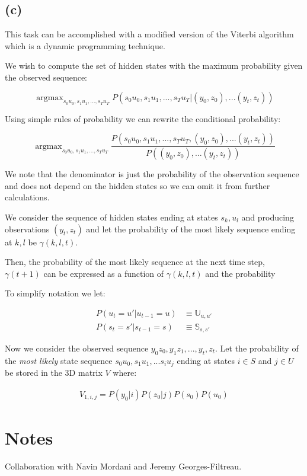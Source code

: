 \documentclass[11pt]{amsart}
\DeclareMathOperator*{\argmax}{argmax}
\begin{document}
\subsection{(c)}

This task can be accomplished with a modified version of the Viterbi algorithm which is a dynamic programming technique.

We wish to compute the set of hidden states with the maximum probability given the observed sequence:

\begin{equation}
\argmax_{s_0 u_0, s_1 u_1, ..., s_T u_T} P(s_0 u_0, s_1 u_1, ..., s_T u_T \vert (y_0, z_0),...(y_t, z_t))
\end{equation}

Using simple rules of probability we can rewrite the conditional probability:

\begin{equation}
\argmax_{s_0 u_0, s_1 u_1, ..., s_T u_T} \frac{P(s_0 u_0, s_1 u_1, ..., s_T u_T, (y_0, z_0),...(y_t, z_t))}{P((y_0, z_0),...(y_t, z_t))}
\end{equation}

We note that the denominator is just the probability of the observation sequence and does not depend on the hidden states so we can omit it from further calculations. 

We consider the sequence of hidden states ending at states $s_k, u_l$ and producing observations $(y_t, z_t)$ and let the probability of the most likely sequence ending at $k, l$ be $\gamma(k, l, t)$.

Then, the probability of the most likely sequence at the next time step, $\gamma(t+1)$ can be expressed as a function of $\gamma(k,l,t)$ and the probability


To simplify notation we let:

\begin{equation}
\begin{aligned}
P(u_t=u' \vert u_{t-1} = u) &\equiv \mathbb{U}_{u, u'}\\
P(s_t=s' \vert s_{t-1} = s) &\equiv \mathbb{S}_{s, s'}
\end{aligned}
\end{equation}

Now we consider the observed sequence $y_0z_0, y_1z_1, ..., y_t, z_t$. Let the probability of the {\it most likely} state sequence $s_0u_0, s_1u_1, ... s_iu_j$ ending at states $i \in S$ and $j \in U$ be stored in the 3D matrix $V$ where:

\begin{equation}
\begin{aligned}
V_{1, i, j} = P(y_0 \vert i) P(z_0 \vert j) P(s_0) P(u_0)
\end{aligned}
\end{equation}

\section{Notes}
Collaboration with Navin Mordani and Jeremy Georges-Filtreau.



\end{document}
